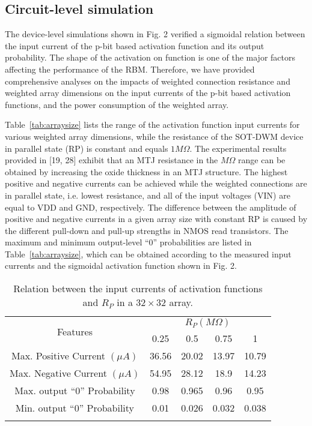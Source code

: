 \subsection{Circuit-level simulation}
The device-level simulations shown in Fig. 2 verified a sigmoidal relation between the input current of the p-bit based activation function and its output probability. The shape of the activation on function is one of the major factors affecting the performance of the RBM. Therefore, we have provided comprehensive analyses on the impacts of weighted connection resistance and weighted array dimensions on the input currents of the p-bit based activation functions, and the power consumption of the weighted array. 



Table~\ref{tab:arraysize} lists the range of the activation function input currents for various weighted array dimensions, while the resistance of the SOT-DWM device in parallel state (RP) is constant and equals $1 M\Omega$.  The experimental results provided in [19, 28] exhibit that an MTJ resistance in the $M\Omega$ range can be obtained by increasing the oxide thickness in an MTJ structure. The highest positive and negative currents can be achieved while the weighted connections are in parallel state, i.e. lowest resistance, and all of the input voltages (VIN) are equal to VDD and GND, respectively. The difference between the amplitude of positive and negative currents in a given array size with constant RP is caused by the different pull-down and pull-up strengths in NMOS read transistors. The maximum and minimum output-level ``0'' probabilities are listed in Table~\ref{tab:arraysize}, which can be obtained according to the measured input currents and the sigmoidal activation function shown in Fig. 2. 





\begin{table}[]
\centering
\small
\caption{Relation between the input currents of activation functions and $R_P$ in a $32 \times 32$ array.}
\vspace{-0.2cm}
\label{tab:rp}
\begin{tabular}{ccccc}
\hline
\multirow{2}{*}{Features}       & \multicolumn{4}{c}{$R_P (M \Omega)$} \\ \cline{2-5} 
                                & 0.25    & 0.5     & 0.75    & 1      \\ \hline
Max. Positive Current $(\mu A)$ & 36.56   & 20.02   & 13.97   & 10.79  \\
Max. Negative Current $(\mu A)$ & 54.95   & 28.12   & 18.9    & 14.23  \\
Max. output ``0'' Probability   & 0.98    & 0.965   & 0.96    & 0.95   \\
Min. output ``0'' Probability   & 0.01    & 0.026   & 0.032   & 0.038  \\ \hline
\vspace{-0.4cm}
\end{tabular}
\end{table}

